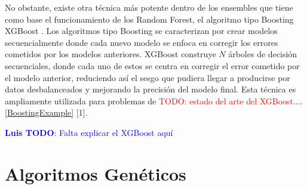 \documentclass{uathesis-es}
\begin{document}
{	No obstante, existe otra técnica más potente dentro de los ensembles que tiene como base el funcionamiento de los Random Forest, el algoritmo tipo Boosting XGBoost \cite{Chen_2016}. Los algoritmos tipo Boosting se caracterizan por crear modelos secuencialmente donde cada nuevo modelo se enfoca en corregir los errores cometidos por los modelos anteriores. XGBoost construye $N$ árboles de decisión secuenciales, donde cada uno de estos se centra en corregir el error cometido por el modelo anterior, reduciendo así el sesgo que pudiera llegar a producirse por datos desbalanceados y mejorando la precisión del modelo final. Esta técnica es ampliamente utilizada para problemas de \textcolor{red}{TODO: estado del arte del XGBoost}.... \ref{BoostingExample} [1].
	
	\textcolor{blue}{\textbf{Luis TODO}: Falta explicar el XGBoost aquí}
	
	
	
	
	
	
	
	
	
	
	
	\section{Algoritmos Genéticos}
	
	
}
\end{document}
